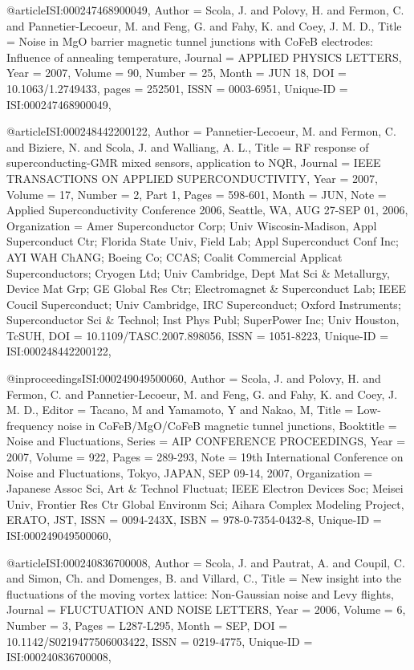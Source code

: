 {@article{ISI:000247468900049,
Author = {Scola, J. and Polovy, H. and Fermon, C. and Pannetier-Lecoeur, M. and
   Feng, G. and Fahy, K. and Coey, J. M. D.},
Title = {{Noise in MgO barrier magnetic tunnel junctions with CoFeB electrodes:
   Influence of annealing temperature}},
Journal = {{APPLIED PHYSICS LETTERS}},
Year = {{2007}},
Volume = {{90}},
Number = {{25}},
Month = {{JUN 18}},
DOI = {{10.1063/1.2749433}},
pages = {{252501}},
ISSN = {{0003-6951}},
Unique-ID = {{ISI:000247468900049}},
}

@article{ISI:000248442200122,
Author = {Pannetier-Lecoeur, M. and Fermon, C. and Biziere, N. and Scola, J. and
   Walliang, A. L.},
Title = {{RF response of superconducting-GMR mixed sensors, application to NQR}},
Journal = {{IEEE TRANSACTIONS ON APPLIED SUPERCONDUCTIVITY}},
Year = {{2007}},
Volume = {{17}},
Number = {{2, Part 1}},
Pages = {{598-601}},
Month = {{JUN}},
Note = {{Applied Superconductivity Conference 2006, Seattle, WA, AUG 27-SEP 01,
   2006}},
Organization = {{Amer Superconductor Corp; Univ Wiscosin-Madison, Appl Superconduct Ctr;
   Florida State Univ, Field Lab; Appl Superconduct Conf Inc; AYI WAH
   ChANG; Boeing Co; CCAS; Coalit Commercial Applicat Superconductors;
   Cryogen Ltd; Univ Cambridge, Dept Mat Sci \& Metallurgy, Device Mat Grp;
   GE Global Res Ctr; Electromagnet \& Superconduct Lab; IEEE Coucil
   Superconduct; Univ Cambridge, IRC Superconduct; Oxford Instruments;
   Superconductor Sci \& Technol; Inst Phys Publ; SuperPower Inc; Univ
   Houston, TcSUH}},
DOI = {{10.1109/TASC.2007.898056}},
ISSN = {{1051-8223}},
Unique-ID = {{ISI:000248442200122}},
}

@inproceedings{ISI:000249049500060,
Author = {Scola, J. and Polovy, H. and Fermon, C. and Pannetier-Lecoeur, M. and
   Feng, G. and Fahy, K. and Coey, J. M. D.},
Editor = {{Tacano, M and Yamamoto, Y and Nakao, M}},
Title = {{Low-frequency noise in CoFeB/MgO/CoFeB magnetic tunnel junctions}},
Booktitle = {{Noise and Fluctuations}},
Series = {{AIP CONFERENCE PROCEEDINGS}},
Year = {{2007}},
Volume = {{922}},
Pages = {{289-293}},
Note = {{19th International Conference on Noise and Fluctuations, Tokyo, JAPAN,
   SEP 09-14, 2007}},
Organization = {{Japanese Assoc Sci, Art \& Technol Fluctuat; IEEE Electron Devices Soc;
   Meisei Univ, Frontier Res Ctr Global Environm Sci; Aihara Complex
   Modeling Project, ERATO, JST}},
ISSN = {{0094-243X}},
ISBN = {{978-0-7354-0432-8}},
Unique-ID = {{ISI:000249049500060}},
}

@article{ISI:000240836700008,
Author = {Scola, J. and Pautrat, A. and Coupil, C. and Simon, Ch. and Domenges, B.
   and Villard, C.},
Title = {{New insight into the fluctuations of the moving vortex lattice:
   Non-Gaussian noise and Levy flights}},
Journal = {{FLUCTUATION AND NOISE LETTERS}},
Year = {{2006}},
Volume = {{6}},
Number = {{3}},
Pages = {{L287-L295}},
Month = {{SEP}},
DOI = {{10.1142/S0219477506003422}},
ISSN = {{0219-4775}},
Unique-ID = {{ISI:000240836700008}},
}

}
